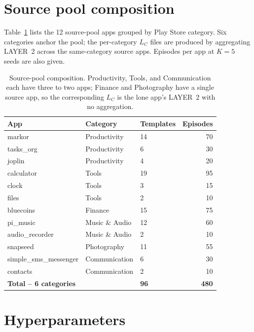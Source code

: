 \section{Source pool composition}
\label{app:source-pool}

Table~\ref{tab:source-apps} lists the 12 source-pool apps grouped by Play Store category. Six categories anchor the pool; the per-category $L_C$ files are produced by aggregating LAYER~2 across the same-category source apps. Episodes per app at $K{=}5$ seeds are also given.

\begin{table}[t]
\small
\centering
\begin{tabular}{lll r}
\hline
\textbf{App} & \textbf{Category} & \textbf{Templates} & \textbf{Episodes} \\
\hline
markor               & Productivity     & 14 & 70 \\
tasks\_org           & Productivity     &  6 & 30 \\
joplin               & Productivity     &  4 & 20 \\
calculator           & Tools            & 19 & 95 \\
clock                & Tools            &  3 & 15 \\
files                & Tools            &  2 & 10 \\
bluecoins            & Finance          & 15 & 75 \\
pi\_music            & Music \& Audio   & 12 & 60 \\
audio\_recorder      & Music \& Audio   &  2 & 10 \\
snapseed             & Photography      & 11 & 55 \\
simple\_sms\_messenger & Communication  &  6 & 30 \\
contacts             & Communication    &  2 & 10 \\
\hline
\textbf{Total -- 6 categories} & & \textbf{96} & \textbf{480} \\
\hline
\end{tabular}
\caption{Source-pool composition. Productivity, Tools, and Communication each have three to two apps; Finance and Photography have a single source app, so the corresponding $L_C$ is the lone app's LAYER~2 with no aggregation.}
\label{tab:source-apps}
\end{table}

\section{Hyperparameters}
\label{app:hyper}

